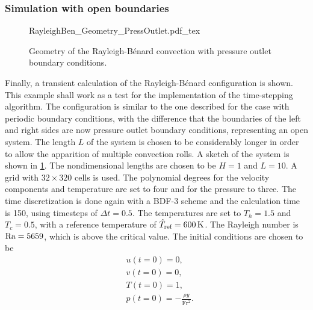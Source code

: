 \subsubsection{Simulation with open boundaries}\label{ssec:MultipleCellConv}
\begin{figure}[h]
	\begin{center}
		\def\svgwidth{0.93\textwidth}
		{RayleighBen_Geometry_PressOutlet.pdf_tex}
		\caption{Geometry of the Rayleigh-Bénard convection with pressure outlet boundary conditions. }
		\label{fig:RayBenGeometry}
	\end{center}
\end{figure}
Finally, a transient calculation of the Rayleigh-Bénard configuration is shown. This example shall work as a test for the implementation of the time-stepping algorithm. The configuration is similar to the one described for the case with periodic boundary conditions, with the difference that the boundaries of the left and right sides are now pressure outlet boundary conditions, representing an open system. The length $L$ of the system is chosen to be considerably longer in order to allow the apparition of multiple convection rolls. A sketch of the system is shown in \cref{fig:RayBenGeometry}. The nondimensional lengths are chosen to be $H=1$ and $L=10$. A grid with $32\times320$ cells is used. The polynomial degrees for the velocity components and temperature are set to four and for the pressure to three. The time discretization is done again with a BDF-3 scheme and the calculation time is 150, using timesteps of $\Delta t = 0.5$. The temperatures are set to $T_h = 1.5$ and $T_c = 0.5$, with a reference temperature of $\hat T_{\text{ref}} = \SI{600}{\kelvin}$. The Rayleigh number is $\text{Ra} = 5659$, which is above the critical value.
The initial conditions are chosen to be
\begin{subequations} 
	\begin{align}
		&u(t=0) = 0, \\
		&v(t=0) = 0, \\
		&T(t=0) = 1, \\
		&p(t=0) = -\frac{\rho y}{\text{Fr}^2}.
	\end{align}
\end{subequations}

